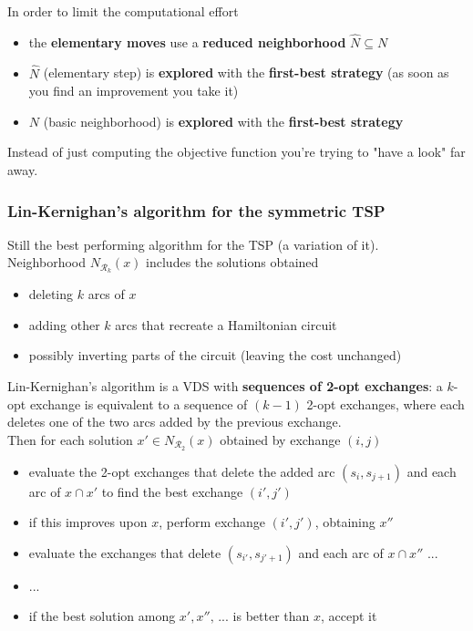\documentclass[11pt]{article}
\begin{document}
	In order to limit the computational effort
	\begin{itemize}
		\item the \textbf{elementary moves} use a \textbf{reduced neighborhood} $\hat{N} \subseteq N$
		
		\item $\hat{N}$ (elementary step) is \textbf{explored} with the \textbf{first-best strategy} (as soon as you find an improvement you take it)
		
		\item $N$ (basic neighborhood) is \textbf{explored} with the \textbf{first-best strategy}
	\end{itemize}
	
	Instead of just computing the objective function you're trying to "have a look" far away.\\
	
	\newpage
	
	\subsubsection{Lin-Kernighan's algorithm for the symmetric TSP}
	Still the best performing algorithm for the TSP (a variation of it).\\
	
	Neighborhood $N_{\mathcal{R}_k} (x)$ includes the solutions obtained
	\begin{itemize}
		\item deleting $k$ arcs of $x$
		
		\item adding other $k$ arcs that recreate a Hamiltonian circuit
		
		\item possibly inverting parts of the circuit (leaving the cost unchanged)
	\end{itemize}
	
	Lin-Kernighan's algorithm is a VDS with \textbf{sequences of 2-opt exchanges}: a $k$-opt exchange is equivalent to a sequence of $(k - 1)$ 2-opt exchanges, where each deletes one of the two arcs added by the previous exchange.\\
	
	Then for each solution $x' \in N_{\mathcal{R}_2} (x)$ obtained by exchange $(i, j)$
	\begin{itemize}
		\item evaluate the 2-opt exchanges that delete the added arc $(s_i , s_{j+1})$ and each arc of $x \cap x'$ to find the best exchange $(i', j')$
		
		\item if this improves upon $x$, perform exchange $(i', j')$, obtaining $x''$
		
		\item evaluate the exchanges that delete $(s_{i'}, s_{j'+1})$ and each arc of $x \cap x''$ ...
		
		\item ...
		
		\item if the best solution among $x', x'', \, ...$ is better than $x$, accept it
	\end{itemize}
		
\end{document}
